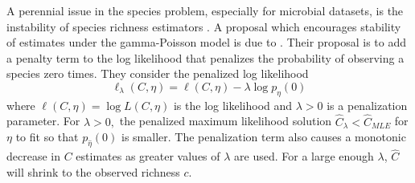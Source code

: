 \documentclass[oupdraft]{bio}
\begin{document}
A perennial issue in the species problem, especially for microbial datasets, is the instability of species richness estimators \citep{Rocchetti:2011tv,willis_2015}.
%
%
%
A proposal which encourages stability of estimates under the gamma-Poisson model is due to \citet{wang_2005}.  Their proposal is to add a penalty term to the log likelihood that penalizes the probability of observing a species zero times. They consider the
penalized log likelihood
\begin{equation}
\ell_\lambda(C, \eta) = \ell(C,\eta) - \lambda \log p_{\eta}(0)
\label{eq:wang_lindsay}
\end{equation}
where $\ell(C,\eta) = \log L(C, \eta)$ is the log likelihood and $\lambda > 0$ is a penalization parameter. For $\lambda > 0,$ the penalized maximum likelihood solution $\hat{C}_\lambda < \hat{C}_{MLE}$
for $\eta$ to fit so that $p_{\widehat{\eta}}(0)$ is smaller.  The penalization term also causes a monotonic decrease in $C$ estimates as greater values of $\lambda$ are used. For a large enough $\lambda$, $\hat{C}$ will shrink to the observed richness $c$.
\end{document}
